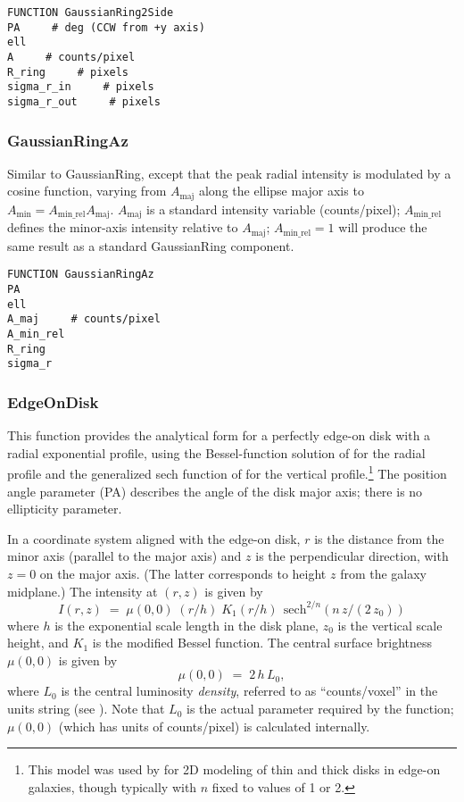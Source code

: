 \documentclass[10pt,a4paper,article]{memoir}
\begin{document}
\begin{verbatim}
FUNCTION GaussianRing2Side
PA     # deg (CCW from +y axis)
ell
A     # counts/pixel
R_ring     # pixels
sigma_r_in     # pixels
sigma_r_out     # pixels
\end{verbatim}


\subsubsection{GaussianRingAz}

Similar to GaussianRing, except that the peak radial intensity is modulated
by a cosine function, varying from $A_{\mathrm{maj}}$ along the ellipse major
axis to $A_{\mathrm{min}} = A_{\mathrm{min\_rel}} A_{\mathrm{maj}}$. $A_{\mathrm{maj}}$
is a standard intensity variable (counts/pixel); $A_{\mathrm{min\_rel}}$ defines
the minor-axis intensity relative to $A_{\mathrm{maj}}$; $A_{\mathrm{min\_rel}} = 1$
will produce the same result as a standard GaussianRing component.

\begin{verbatim}
FUNCTION GaussianRingAz
PA
ell
A_maj     # counts/pixel
A_min_rel
R_ring
sigma_r
\end{verbatim}


\subsubsection{EdgeOnDisk}

This function provides the analytical form for a perfectly edge-on disk with a
radial exponential profile, using the Bessel-function solution of \citet{vdk81}
for the radial profile and the generalized sech function of \citet{vdk88} for
the vertical profile.\footnote{This model was used by \citet{yoachim06} for 2D
modeling of thin and thick disks in edge-on galaxies, though typically with $n$
fixed to values of 1 or 2.} The position angle parameter (PA) describes the
angle of the disk major axis; there is no ellipticity parameter.

In a coordinate system aligned with the edge-on disk, $r$ is the distance from the minor
axis (parallel to the major axis) and $z$ is the perpendicular direction, with $z = 0$
on the major axis. (The latter corresponds to height $z$ from the galaxy midplane.) The 
intensity at $(r,z)$ is given by
\begin{equation}
I(r,z) \; = \; \mu(0,0) \; (r/h) \; K_{1}(r/h) \;\, {\mathrm{sech}}^{2/n} (n \, z/(2 \, z_{0}))
\end{equation}
where $h$ is the exponential scale length in the disk plane, $z_{0}$ is the vertical
scale height, and $K_{1}$ is the modified Bessel function. The central surface brightness 
$\mu(0,0)$ is given by
\begin{equation}
\mu(0,0) \; = \;  2 \, h \, L_{0},
\end{equation}
where $L_{0}$ is the central luminosity \textit{density}, referred to as ``counts/voxel''
in the units string (see \citealt{vdk81}). Note that 
$L_{0}$ is the actual parameter required by the function; $\mu(0,0)$ (which has
units of counts/pixel) is calculated internally.
\end{document}
